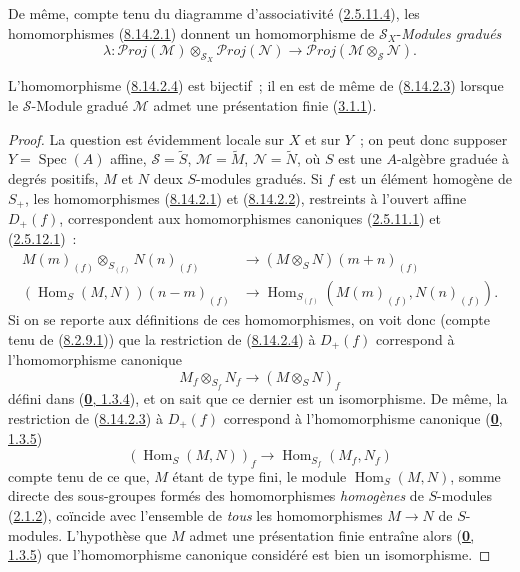 \begin{env}[8.14.2]
De même, compte tenu du diagramme d'associativité
(\hyperref[II.2.5.11.4-fr]{2.5.11.4}), les homomorphismes
(\hyperref[II.8.14.2.1-fr]{8.14.2.1}) donnent un homomorphisme de
$\mathcal{S}_X$-\emph{Modules gradués}
\begin{equation}
\label{II.8.14.2.4-fr}
  \lambda:\mathcal{P}\mathit{roj}(\mathcal{M})
  \otimes_{\mathcal{S}_X}\mathcal{P}\mathit{roj}(\mathcal{N})
  \to\mathcal{P}\mathit{roj}(\mathcal{M}\otimes_{\mathcal{S}}\mathcal{N}).
\tag{8.14.2.4}
\end{equation}
\end{env}

\begin{proposition}[8.14.3]
\label{II.8.14.3-fr}
L'homomorphisme (\hyperref[II.8.14.2.4-fr]{8.14.2.4}) est bijectif~; il en
est de même de (\hyperref[II.8.14.2.3-fr]{8.14.2.3}) lorsque le
$\mathcal{S}$-Module gradué $\mathcal{M}$ admet une présentation finie
(\hyperref[II.3.1.1-fr]{3.1.1}).
\end{proposition}

\begin{proof}
La question est évidemment locale sur $X$ et sur $Y$~; on peut donc supposer
$Y=\operatorname{Spec}(A)$ affine, $\mathcal{S}=\widetilde{S}$,
$\mathcal{M}=\widetilde{M}$, $\mathcal{N}=\widetilde{N}$, où $S$ est une
$A$-algèbre graduée à degrés positifs, $M$ et $N$ deux $S$-modules gradués.
Si $f$ est un élément homogène de $S_+$, les homomorphismes
(\hyperref[II.8.14.2.1-fr]{8.14.2.1}) et
(\hyperref[II.8.14.2.2-fr]{8.14.2.2}), restreints à l'ouvert affine
$D_+(f)$, correspondent aux homomorphismes canoniques
(\hyperref[II.2.5.11.1-fr]{2.5.11.1}) et
(\hyperref[II.2.5.12.1-fr]{2.5.12.1})~:
\begin{align*}
  M(m)_{(f)}\otimes_{S_{(f)}}N(n)_{(f)}
  &\to(M\otimes_S N)(m+n)_{(f)}\\
  (\operatorname{Hom}_S(M,N))(n-m)_{(f)}
  &\to\operatorname{Hom}_{S_{(f)}}(M(m)_{(f)},N(n)_{(f)}).
\end{align*}
Si on se reporte aux définitions de ces homomorphismes, on voit donc (compte
tenu de (\hyperref[II.8.2.9.1-fr]{8.2.9.1})) que la restriction de
(\hyperref[II.8.14.2.4-fr]{8.14.2.4}) à $D_+(f)$ correspond à
l'homomorphisme canonique
\[
  M_f\otimes_{S_f}N_f\to(M\otimes_S N)_f
\]
défini dans (\hyperref[0.1.3.4-fr]{\textbf{0}, 1.3.4}), et on sait que ce dernier est
un isomorphisme. De même, la restriction de
(\hyperref[II.8.14.2.3-fr]{8.14.2.3}) à $D_+(f)$ correspond à
l'homomorphisme canonique (\hyperref[0.1.3.5-fr]{\textbf{0}, 1.3.5})
\[
  (\operatorname{Hom}_S(M,N))_f\to
  \operatorname{Hom}_{S_f}(M_f,N_f)
\]
compte tenu de ce que, $M$ étant de type fini, le module
$\operatorname{Hom}_S(M,N)$, somme directe des sous-groupes formés des
homomorphismes \emph{homogènes} de $S$-modules
(\hyperref[II.2.1.2-fr]{2.1.2}), coïncide avec l'ensemble de \emph{tous} les
homomorphismes $M\to N$ de $S$-modules. L'hypothèse que $M$ admet une
présentation finie entraîne alors (\hyperref[0.1.3.5-fr]{\textbf{0}, 1.3.5}) que
l'homomorphisme canonique considéré est bien un isomorphisme.
\end{proof}

